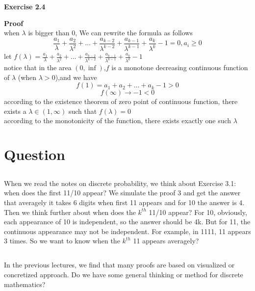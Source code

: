 \documentclass{article} %
\begin{document}
	\textbf{Exercise 2.4}\par
    \textbf{Proof }\\
    when $\lambda$ is bigger than $0$, We can rewrite the formula as follows\\
    $$
    \frac{a_1}{\lambda} +\frac{a_2}{\lambda^{2}} +\dots + \frac{a_{k-2}}{\lambda^{k-2}} + \frac{a_{k-1}}{\lambda^{k-1}} + \frac{a_k}{\lambda^k} -1=0,a_i \ge 0
    $$
    let $f(\lambda)=\frac{a_1}{\lambda} +\frac{a_2}{\lambda^{2}} +\dots + \frac{a_{k-2}}{\lambda^{k-2}} + \frac{a_{k-1}}{\lambda^{k-1}} + \frac{a_k}{\lambda^k} -1 $\\
    notice that in the area $(0,\inf)$,$f$ is a monotone decreasing continuous function of $\lambda$ (when $\lambda>0$),and we have\\
    $$
    f(1)=a_1+a_2+\dots+a_k-1>0
    $$
    $$
    f(\infty)\to -1<0
    $$
    according to the existence theorem of zero point of continuous function, there exists a $\lambda \in (1,\infty)$ such that $f(\lambda)=0$\\
    according to the monotonicity of the function, there exists exactly one such $\lambda$


\section{Question}
\subsection{}When we read the notes on discrete probability, we think about Exercise 3.1: when does the first 11/10 appear? We simulate the proof 3 and get the answer that averagely it takes 6 digits when first 11 appears and for 10 the answer is 4. Then we think further about when does the $k^{th}$ 11/10 appear? For 10, obviously, each appearance of 10 is independent, so the answer should be 4k. But for 11, the continuous appearance may not be independent. For example, in 1111, 11 appears 3 times. So we want to know when the $k^{th}$ 11 appears averagely? 
\subsection{}In the previous lectures, we find that many proofs are based on visualized or concretized approach. Do we have some general thinking or method for discrete mathematics? 
\end{document}
